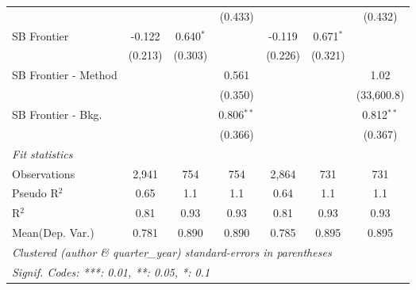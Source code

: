 \begin{tabular}{lcccccc}
                        &         &             & (0.433)      &         &             & (0.432)\\   
   SB Frontier          & -0.122  & 0.640$^{*}$ &              & -0.119  & 0.671$^{*}$ &   \\   
                        & (0.213) & (0.303)     &              & (0.226) & (0.321)     &   \\   
   SB Frontier - Method &         &             & 0.561        &         &             & 1.02\\   
                        &         &             & (0.350)      &         &             & (33,600.8)\\   
   SB Frontier - Bkg.   &         &             & 0.806$^{**}$ &         &             & 0.812$^{**}$\\   
                        &         &             & (0.366)      &         &             & (0.367)\\   
   \midrule
   \emph{Fit statistics}\\
   Observations         & 2,941   & 754         & 754          & 2,864   & 731         & 731\\  
   Pseudo R$^2$         & 0.65    & 1.1         & 1.1          & 0.64    & 1.1         & 1.1\\  
   R$^2$                & 0.81    & 0.93        & 0.93         & 0.81    & 0.93        & 0.93\\  
Mean(Dep. Var.) & 0.781 & 0.890 & 0.890 & 0.785 & 0.895 & 0.895 \\
   \midrule \midrule
   \multicolumn{7}{l}{\emph{Clustered (author \& quarter\_year) standard-errors in parentheses}}\\
   \multicolumn{7}{l}{\emph{Signif. Codes: ***: 0.01, **: 0.05, *: 0.1}}\\
\end{tabular}
\par\endgroup
